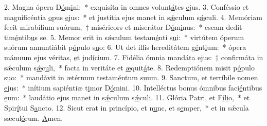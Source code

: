 2. Magna ópera D\uline{ó}m\uline{i}ni:~* exquisíta in omnes volunt\uline{á}tes \uline{e}jus.
3. Conféssio et magnificéntia \uline{o}pus \uline{e}jus:~* et justítia ejus manet in s\uline{ǽ}culum s\uline{ǽ}culi.
4. Memóriam fecit mirabílium suórum,~† miséricors et miserátor D\uline{ó}m\uline{i}nus:~* escam dedit tim\uline{é}ntib\uline{u}s se.
5. Memor erit in sǽculum testam\uline{é}nti s\uline{u}i:~* virtútem óperum suórum annuntiábit p\uline{ó}pulo s\uline{u}o:
6. Ut det illis hereditátem g\uline{é}nt\uline{i}um:~* ópera mánuum ejus véritas, \uline{e}t jud\uline{í}cium.
7. Fidélia ómnia mandáta ejus:~† confirmáta in sǽculum s\uline{ǽ}c\uline{u}li,~* facta in veritáte et \uline{æ}quit\uline{á}te.
8. Redemptiónem misit p\uline{ó}pulo s\uline{u}o:~* mandávit in ætérnum testam\uline{é}ntum s\uline{u}um.
9. Sanctum, et terríbile n\uline{o}men \uline{e}jus:~* inítium sapiéntiæ t\uline{i}mor D\uline{ó}mini.
10. Intelléctus bonus ómnibus faci\uline{é}ntibus \uline{e}um:~* laudátio ejus manet in s\uline{ǽ}culum s\uline{ǽ}culi.
11. Glória Patri, et F\uline{í}l\uline{i}o,~* et Spir\uline{í}tui S\uline{a}ncto.
12. Sicut erat in princípio, et n\uline{u}nc, et s\uline{e}mper,~* et in sǽcula sæcul\uline{ó}rum. \uline{A}men.
